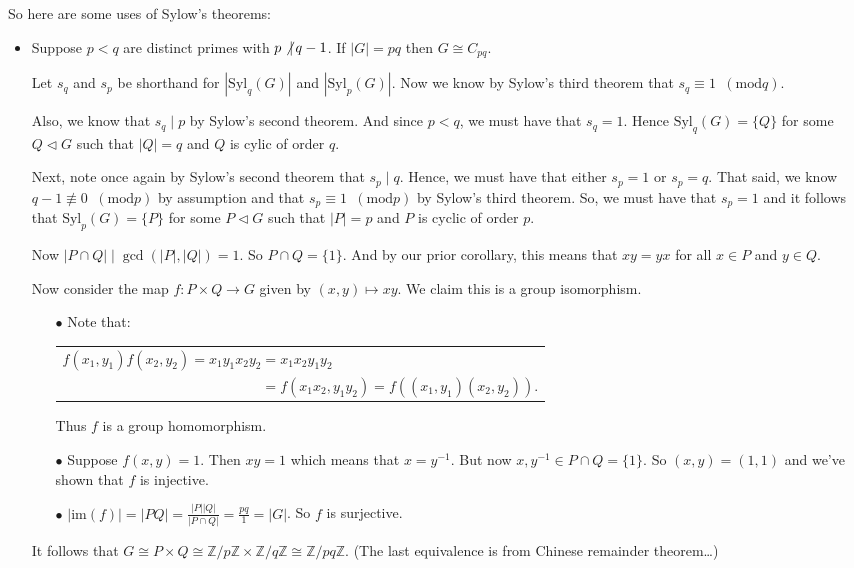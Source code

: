 \documentclass{book}
\newcommand{\pracTwo}{
   \color{Orange}%
   \fontsize{12}{14}\selectfont%
}
\newenvironment{myIndent}{%
   \begin{adjustwidth}{2.5em}{0em}%
}{%
   \end{adjustwidth}%
}
\newcommand{\myIm}{\mathrm{im}}
\newcommand{\divides}{\mathop{\mid}}
\newcommand{\mMod}[1]{\phantom{a}(\mathrel{\mathrm{mod}} #1)}
\newcommand{\Syl}{\mathrm{Syl}}
\newcommand{\retTwo}{\hfill\bigbreak}
\begin{document}
So here are some uses of Sylow's theorems:
\begin{itemize}
	\item Suppose $p < q$ are distinct primes with $p \not\divides q- 1$. If $|G| = pq$ then $G \cong C_{pq}$.
	
	\begin{myIndent}\pracTwo
		Let $s_q$ and $s_p$ be shorthand for $|\Syl_q(G)|$ and $|\Syl_p(G)|$. Now we know by Sylow's third theorem that $s_q \equiv 1 \mMod{q}$.\newpage
		
		Also, we know that $s_q \divides p$ by Sylow's second theorem. And since $p < q$, we must have that $s_q = 1$. Hence $\Syl_q(G) = \{Q\}$ for some $Q \lhd G$ such that $|Q| = q$ and $Q$ is cylic of order $q$.\retTwo

		Next, note once again by Sylow's second theorem that $s_p \divides q$. Hence, we must have that either $s_p = 1$ or $s_p = q$. That said, we know $q - 1 \not\equiv 0 \mMod{p}$ by assumption and that $s_p \equiv 1 \mMod{p}$ by Sylow's third theorem. So, we must have that $s_p = 1$ and it follows that $\Syl_p(G) = \{P\}$ for some $P \lhd G$ such that $|P| = p$ and $P$ is cyclic of order $p$.\retTwo

		Now $|P \cap Q| \divides \gcd(|P|, |Q|) = 1$. So $P \cap Q = \{1\}$. And by our prior corollary, this means that $xy = yx$ for all $x \in P$ and $y \in Q$.\retTwo

		Now consider the map $f : P \times Q \to G$ given by $(x, y) \mapsto xy$. We claim this is a group isomorphism.
		\begin{itemize}
			\item[$\bullet$] Note that:
			
			{\centering\begin{tabular}{l}
				$f(x_1, y_1)f(x_2, y_2) = x_1y_1x_2y_2 = x_1x_2y_1y_2$\\
				$\phantom{f(x_1, y_1)f(x_2, y_2) = x_1y_1x_2y_2} = f(x_1x_2, y_1y_2) = f((x_1, y_1)(x_2,y_2))$.
			\end{tabular}\retTwo\par}

			Thus $f$ is a group homomorphism.\retTwo

			\item[$\bullet$] Suppose $f(x, y) = 1$. Then $xy = 1$ which means that $x = y^{-1}$. But now $x, y^{-1} \in P \cap Q = \{1\}$. So $(x, y) = (1, 1)$ and we've shown that $f$ is injective.\retTwo
			
			\item[$\bullet$] $|\myIm(f)| = |PQ| = \frac{|P||Q|}{|P \cap Q|} = \frac{pq}{1} = |G|$. So $f$ is surjective.\retTwo
		\end{itemize}

		It follows that $G \cong P \times Q \cong \mathbb{Z}/p\mathbb{Z} \times \mathbb{Z}/q\mathbb{Z} \cong \mathbb{Z}/pq\mathbb{Z}$. (The last equivalence is from Chinese remainder theorem\dots)
	\end{myIndent}
\end{itemize}
\end{document}

